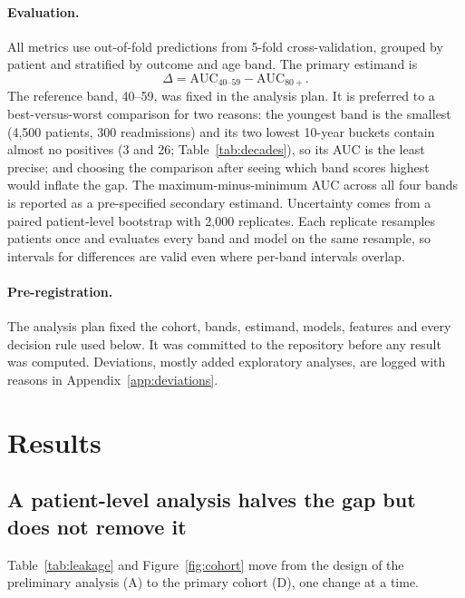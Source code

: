 \documentclass{article}
\begin{document}
\paragraph{Evaluation.} All metrics use out-of-fold predictions from 5-fold cross-validation, grouped by patient and stratified by outcome and age band. The primary estimand is
\[
\Delta = \mathrm{AUC}_{40\text{--}59} - \mathrm{AUC}_{80+}.
\]
The reference band, 40--59, was fixed in the analysis plan. It is preferred to a best-versus-worst comparison for two reasons: the youngest band is the smallest (4,500 patients, 300 readmissions) and its two lowest 10-year buckets contain almost no positives (3 and 26; Table~\ref{tab:decades}), so its AUC is the least precise; and choosing the comparison after seeing which band scores highest would inflate the gap. The maximum-minus-minimum AUC across all four bands is reported as a pre-specified secondary estimand.
Uncertainty comes from a paired patient-level bootstrap with 2,000 replicates. Each replicate resamples patients once and evaluates every band and model on the same resample, so intervals for differences are valid even where per-band intervals overlap.

\paragraph{Pre-registration.} The analysis plan fixed the cohort, bands, estimand, models, features and every decision rule used below. It was committed to the repository before any result was computed. Deviations, mostly added exploratory analyses, are logged with reasons in Appendix~\ref{app:deviations}.

\section{Results}

\subsection{A patient-level analysis halves the gap but does not remove it}

Table~\ref{tab:leakage} and Figure~\ref{fig:cohort} move from the design of the preliminary analysis (A) to the primary cohort (D), one change at a time.
\end{document}
